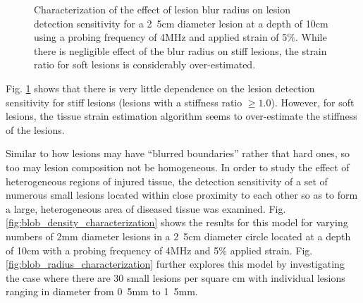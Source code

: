 			\begin{figure}[!t]
				\centering
				\caption[Lesion blur radius characterization]{Characterization of the effect of lesion blur radius on lesion detection sensitivity for a \unit{2.5}{cm} diameter lesion at a depth of \unit{10}{cm} using a probing frequency of \unit{4}{MHz} and applied strain of \unit{5}{\%}. While there is negligible effect of the blur radius on stiff lesions, the strain ratio for soft lesions is considerably over-estimated.}
				\label{fig:blur_radius_characterization}
			\end{figure}

			Fig. \ref{fig:blur_radius_characterization} shows that there is very little dependence on the lesion detection sensitivity for stiff lesions (lesions with a stiffness ratio $\geq 1.0$). However, for soft lesions, the tissue strain estimation algorithm seems to over-estimate the stiffness of the lesions.


			Similar to how lesions may have ``blurred boundaries'' rather that hard ones, so too may lesion composition not be homogeneous. In order to study the effect of heterogeneous regions of injured tissue, the detection sensitivity of a set of numerous small lesions located within close proximity to each other so as to form a large, heterogeneous area of diseased tissue was examined. Fig. \ref{fig:blob_density_characterization} shows the results for this model for varying numbers of \unit{2}{mm} diameter lesions in a \unit{2.5}{cm} diameter circle located at a depth of \unit{10}{cm} with a probing frequency of \unit{4}{MHz} and \unit{5}{\%} applied strain. Fig. \ref{fig:blob_radius_characterization} further explores this model by investigating the case where there are 30 small lesions per square \unit{}{cm} with individual lesions ranging in diameter from \unit{0.5}{mm} to \unit{1.5}{mm}.

